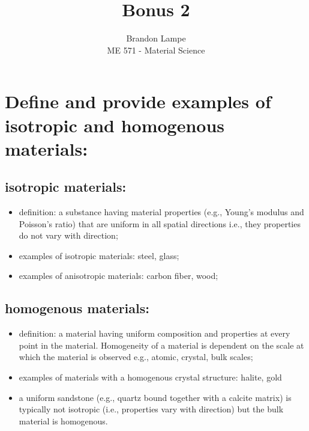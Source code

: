 \documentclass[10pt, letterpaper]{article}
\begin{document}
 
 
\title{Bonus 2}%
\author{Brandon Lampe\\ %
ME 571 - Material Science} %
 
\maketitle
 
\section{Define and provide examples of isotropic and homogenous materials:}  
	\subsection{isotropic materials:}
		\begin{itemize}
			\item definition:  a substance having material properties (e.g., Young's modulus and Poisson's ratio) that are uniform in all spatial directions i.e., they properties do not vary with direction;
			\item examples of isotropic materials:  steel, glass;
			\item examples of anisotropic materials:  carbon fiber, wood;
		\end{itemize}
	\subsection{homogenous materials:}
		\begin{itemize}
			\item definition:  a material having uniform composition and properties at every point in the material.  Homogeneity of a material is dependent on the scale at which the material is observed e.g., atomic, crystal, bulk scales;
			\item examples of materials with a homogenous crystal structure:  halite, gold  
			\item a uniform sandstone (e.g., quartz bound together with a calcite matrix) is typically not isotropic (i.e., properties vary with direction) but the bulk material is homogenous.
		\end{itemize}			 

 
\end{document}
